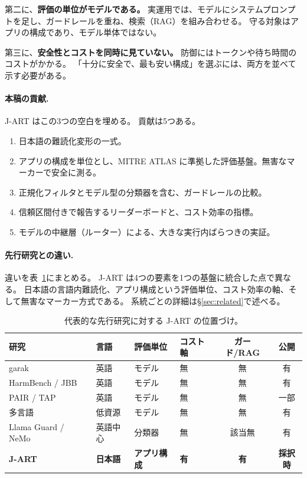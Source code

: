 \documentclass[11pt]{ltjsarticle}
\begin{document}
第二に、\textbf{評価の単位がモデルである。}
実運用では、モデルにシステムプロンプトを足し、ガードレールを重ね、検索（RAG）を組み合わせる。
守る対象はアプリの構成であり、モデル単体ではない。

第三に、\textbf{安全性とコストを同時に見ていない。}
防御にはトークンや待ち時間のコストがかかる。
「十分に安全で、最も安い構成」を選ぶには、両方を並べて示す必要がある。

\paragraph{本稿の貢献.}
J-ART はこの3つの空白を埋める。
貢献は5つある。
\begin{enumerate}[label=(\alph*),leftmargin=1.6em,itemsep=2pt]
\item 日本語の難読化変形の一式。
\item アプリの構成を単位とし、MITRE ATLAS に準拠した評価基盤。無害なマーカーで安全に測る。
\item 正規化フィルタとモデル型の分類器を含む、ガードレールの比較。
\item 信頼区間付きで報告するリーダーボードと、コスト効率の指標。
\item モデルの中継層（ルーター）による、大きな実行内ばらつきの実証。
\end{enumerate}

\paragraph{先行研究との違い.}
違いを表~\ref{tab:related}にまとめる。
J-ART は4つの要素を1つの基盤に統合した点で異なる。
日本語の言語内難読化、アプリ構成という評価単位、コスト効率の軸、そして無害なマーカー方式である。
系統ごとの詳細は\S\ref{sec:related}で述べる。

\begin{table}[t]
\centering\small
\caption{代表的な先行研究に対する J-ART の位置づけ。}
\label{tab:related}
\begin{tabular}{@{}p{2.6cm}p{1.8cm}p{2.2cm}p{1.2cm}cc@{}}
\toprule
研究 & 言語 & 評価単位 & コスト軸 & ガード/RAG & 公開 \\
\midrule
garak~\cite{garak} & 英語 & モデル & 無 & 無 & 有 \\
HarmBench / JBB~\cite{harmbench,jbb} & 英語 & モデル & 無 & 無 & 有 \\
PAIR / TAP~\cite{pair,tap} & 英語 & モデル & 無 & 無 & 一部 \\
多言語~\cite{lowres,deng,alllang} & 低資源 & モデル & 無 & 無 & 有 \\
Llama Guard / NeMo~\cite{llamaguard,nemo} & 英語中心 & 分類器 & 無 & 該当無 & 有 \\
\textbf{J-ART} & \textbf{日本語} & \textbf{アプリ構成} & \textbf{有} & \textbf{有} & \textbf{採択時} \\
\bottomrule
\end{tabular}
\end{table}
\end{document}
